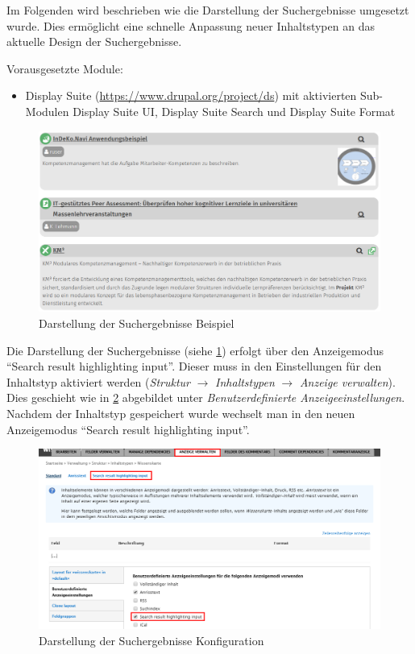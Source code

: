 Im Folgenden wird beschrieben wie die Darstellung der Suchergebnisse umgesetzt wurde. Dies ermöglicht eine schnelle Anpassung neuer Inhaltstypen an das aktuelle Design der Suchergebnisse.

Vorausgesetzte Module:
\begin{itemize}
	\item Display Suite (\url{https://www.drupal.org/project/ds}) mit aktivierten Sub-Modulen Display Suite UI, Display Suite Search und Display Suite Format
\end{itemize}


\begin{figure}[H]
	\centering
	\includegraphics[height=0.20\textheight]{images/example_searchresult}
	\caption{Darstellung der Suchergebnisse Beispiel}
	\label{fig:example_searchresult}
\end{figure}



Die Darstellung der Suchergebnisse (siehe \cref{fig:example_searchresult}) erfolgt über den Anzeigemodus \enquote{Search result highlighting input}. Dieser muss in den Einstellungen für den Inhaltstyp aktiviert werden (\textit{Struktur} $\rightarrow$ \textit{Inhaltstypen} $\rightarrow$ \textit{Anzeige verwalten}). Dies geschieht wie in \cref{fig:config_searchresult_viewmode} abgebildet unter \textit{Benutzerdefinierte Anzeigeeinstellungen}. Nachdem der Inhaltstyp gespeichert wurde wechselt man in den neuen Anzeigemodus \enquote{Search result highlighting input}.

\begin{figure}[H]
	\centering
	\includegraphics[height=0.20\textheight]{images/config_searchresult_viewmode}
	\caption{Darstellung der Suchergebnisse Konfiguration}
	\label{fig:config_searchresult_viewmode}
\end{figure}


